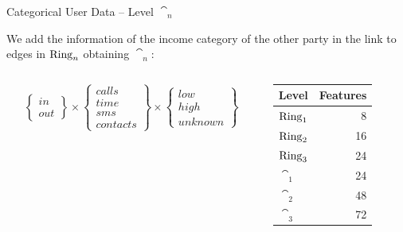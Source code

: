 \documentclass[usenames,dvipsnames]{beamer}
\begin{document}
\begin{frame}{Categorical User Data -- Level $\cat_n$}

We add the information of the income category of the other party in the link to 
edges in $\operatorname{Ring}_{n}$ obtaining $\cat_n$:

\begin{columns}
\begin{column}{0.6\textwidth}
\begin{equation*}
\begin{Bmatrix} in \\ out \end{Bmatrix}
\times
\begin{Bmatrix} calls \\ time \\ sms \\ contacts \end{Bmatrix}
\times
\begin{Bmatrix} low \\ high \\ unknown \end{Bmatrix}
\label{eq:matcatuserdata}
\end{equation*}
\end{column}
\begin{column}{0.4\textwidth}
\begin{table}[t]
\begin{tabular}{>{\bfseries}l r}
\toprule
Level & Features \\
\midrule
$\operatorname{Ring}_1$ & \num{8}  \\
$\operatorname{Ring}_2$ & \num{16} \\
$\operatorname{Ring}_3$ & \num{24} \\
$\cat_1$ & \num{24} \\
$\cat_2$ & \num{48} \\
$\cat_3$ & \num{72} \\
\bottomrule
\end{tabular}
\end{table}
\end{column}
\end{columns}

\end{frame}
\end{document}
